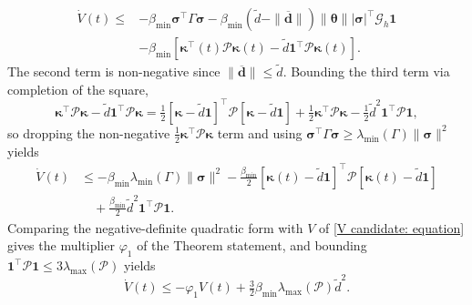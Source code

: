 {\begin{align*}
\dot{V}(t)\le& -\beta_{\min}\boldsymbol{\sigma}^\top\Gamma\boldsymbol{\sigma} - \beta_{\min}(\tilde{d}-\|\boldsymbol{\overline{d}}\|)\|\boldsymbol{\theta}\||\boldsymbol{\sigma}|^\top\mathcal{G}_h\boldsymbol{1}\\
&- \beta_{\min}[\boldsymbol{\kappa}^\top(t)\mathcal{P}\boldsymbol{\kappa}(t) - \tilde{d}\boldsymbol{1}^\top\mathcal{P}\boldsymbol{\kappa}(t)].
\end{align*}
The second term is non-negative since $\|\boldsymbol{\overline{d}}\|\le\tilde{d}$. Bounding the third term via completion of the square,
\begin{equation*}
    \boldsymbol{\kappa}^\top\mathcal{P}\boldsymbol{\kappa} - \tilde{d}\boldsymbol{1}^\top\mathcal{P}\boldsymbol{\kappa} = \tfrac12[\boldsymbol{\kappa}-\tilde{d}\boldsymbol{1}]^\top\mathcal{P}[\boldsymbol{\kappa}-\tilde{d}\boldsymbol{1}] + \tfrac12\boldsymbol{\kappa}^\top\mathcal{P}\boldsymbol{\kappa} - \tfrac12\tilde{d}^2\boldsymbol{1}^\top\mathcal{P}\boldsymbol{1},
\end{equation*}
so dropping the non-negative $\tfrac12\boldsymbol{\kappa}^\top\mathcal{P}\boldsymbol{\kappa}$ term and using $\boldsymbol{\sigma}^\top\Gamma\boldsymbol{\sigma}\ge\lambda_{\min}(\Gamma)\|\boldsymbol{\sigma}\|^2$ yields
\begin{align*}
\dot{V}(t)&\le -\beta_{\min}\lambda_{\min}(\Gamma)\|\boldsymbol{\sigma}\|^2 - \tfrac{\beta_{\min}}{2}[\boldsymbol{\kappa}(t)-\tilde{d}\boldsymbol{1}]^\top\mathcal{P}[\boldsymbol{\kappa}(t)-\tilde{d}\boldsymbol{1}]\\
&\quad + \tfrac{\beta_{\min}}{2}\tilde{d}^2\boldsymbol{1}^\top\mathcal{P}\boldsymbol{1}.
\end{align*}
Comparing the negative-definite quadratic form with $V$ of \eqref{V candidate: equation} gives the multiplier $\varphi_1$ of the Theorem statement, and bounding $\boldsymbol{1}^\top\mathcal{P}\boldsymbol{1}\le 3\lambda_{\max}(\mathcal{P})$ yields
\begin{equation} \label{Vdot bound: equation}
    \dot{V}(t)\le -\varphi_1 V(t) + \tfrac32\beta_{\min}\lambda_{\max}(\mathcal{P})\tilde{d}^2.
\end{equation}
}
